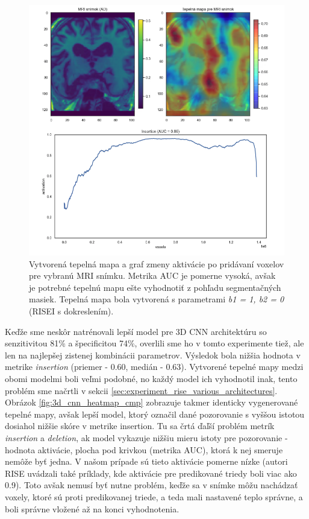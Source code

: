 \begin{figure}[h!]
    \centering
    \includegraphics[width=14cm]{assets/images/heatmap_and_auc_example.png}
    \caption{Vytvorená tepelná mapa a graf zmeny aktivácie po pridávaní voxelov pre vybranú MRI snímku. Metrika AUC je pomerne vysoká, avšak je potrebné tepelnú mapu ešte vyhodnotiť z pohľadu segmentačných masiek. Tepelná mapa bola vytvorená s parametrami \textit{b1 = 1, b2 = 0} (RISEI s dokreslením).}
    \label{fig:heatmap_and_auc_example}
\end{figure}

Keďže sme neskôr natrénovali lepší model pre 3D CNN architektúru so senzitivitou 81\% a špecificitou 74\%, overlili sme ho v tomto experimente tiež, ale len na najlepšej zistenej kombinácii parametrov. Výsledok bola nižšia hodnota v metrike \textit{insertion} (priemer - 0.60, medián - 0.63). Vytvorené tepelné mapy medzi obomi modelmi boli veľmi podobné, no každý model ich vyhodnotil inak, tento problém sme načrtli v sekcii \ref{sec:experiment_rise_various_architectures}. Obrázok \ref{fig:3d_cnn_heatmap_cmp} zobrazuje takmer identicky vygenerované tepelné mapy, avšak lepší model, ktorý označil dané pozorovanie s vyššou istotou 
dosiahol nižšie skóre v metrike insertion. Tu sa črtá ďaľší problém metrík \textit{insertion} a \textit{deletion}, ak model vykazuje nižšiu mieru istoty pre pozorovanie - hodnota aktivácie, plocha pod krivkou (metrika AUC), ktorá k nej smeruje nemôže byť jedna. V našom prípade sú tieto aktivácie pomerne nízke (autori RISE uvádzali také príklady, kde aktivácie pre predikované triedy boli viac ako 0.9). Toto avšak nemusí byť nutne problém, keďže sa v snímke môžu nachádzať voxely, ktoré sú proti predikovanej triede, a teda mali nastavené teplo správne, a boli správne vložené až na konci vyhodnotenia. 

